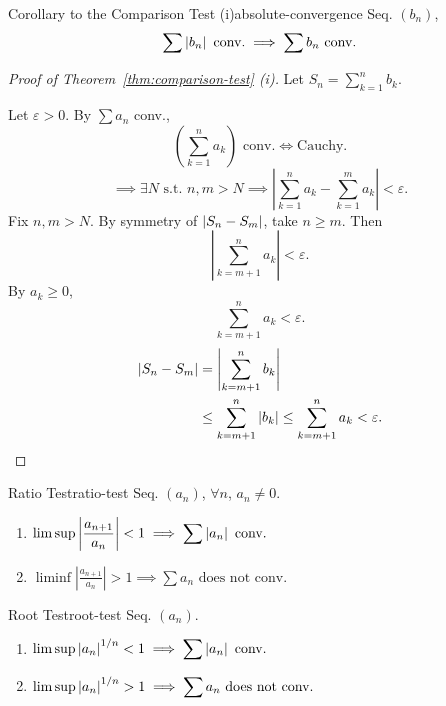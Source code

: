 \begin{theorem}{Corollary to the Comparison Test (i)}{absolute-convergence}
  Seq. $(b_n)$,
  \[
    \sum\left\lvert b_n \right\rvert\text{ conv.}\implies\sum b_n\text{ conv.}
  \]
\end{theorem}

\begin{proof}[Proof of Theorem~\ref{thm:comparison-test} (i)]
  Let $S_n=\sum_{k=1}^{n}b_k$.

  Let $\varepsilon>0$. By $\sum a_n$ conv.,
  \[
    \left(\sum_{k=1}^{n}a_k\right)\text{ conv.}\iff\text{Cauchy}.
  \]
  \[
    \implies\exists N\text{ s.t. }n,m>N\implies
    \left|\sum_{k=1}^{n}a_k-\sum_{k=1}^{m}a_k\right|<\varepsilon.
  \]
  Fix $n,m>N$. By symmetry of $\left\lvert S_n-S_m \right\rvert$, take $n\ge m$. Then
  \[
    \left|\sum_{k=m+1}^{n}a_k\right|<\varepsilon.
  \]
  By $a_k\ge0$,
  \[
    \sum_{k=m+1}^{n}a_k<\varepsilon.
  \]
  \[
    \begin{aligned}
      \left\lvert S_n-S_m \right\rvert
       & =\left|\sum_{k=m+1}^{n}b_k\right| \\
       & \le\sum_{k=m+1}^{n}\left\lvert b_k \right\rvert
      \le\sum_{k=m+1}^{n}a_k<\varepsilon.
    \end{aligned}
  \]
\end{proof}

\begin{theorem}{Ratio Test}{ratio-test}
  Seq. $(a_n)$, $\forall n$, $a_n\ne0$.
  \begin{enumerate}[label=(\roman*)]
    \item $\displaystyle\limsup\left|\frac{a_{n+1}}{a_n}\right|<1
            \implies\sum\left\lvert a_n \right\rvert\text{ conv.}$
    \item $\displaystyle\liminf\left|\frac{a_{n+1}}{a_n}\right|>1
            \implies\sum a_n\text{ does not conv.}$
  \end{enumerate}
\end{theorem}

\begin{theorem}{Root Test}{root-test}
  Seq. $(a_n)$.
  \begin{enumerate}[label=(\roman*)]
    \item $\displaystyle\limsup\left\lvert a_n \right\rvert^{1/n}<1
            \implies\sum\left\lvert a_n \right\rvert\text{ conv.}$
    \item $\displaystyle\limsup\left\lvert a_n \right\rvert^{1/n}>1
            \implies\sum a_n\text{ does not conv.}$
  \end{enumerate}
\end{theorem}


